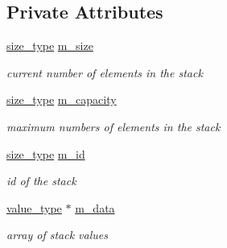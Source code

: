 \subsection*{Private Attributes}
\begin{DoxyCompactItemize}
\item 
\mbox{\label{class_my_stack_a6e16f21887aa6db7709cf79a8d55f92b}} 
\hyperlink{class_my_stack_a6e8ab1801eb1cf3b66928e0c0f2fe0fe}{size\+\_\+type} \hyperlink{class_my_stack_a6e16f21887aa6db7709cf79a8d55f92b}{m\+\_\+size}
\begin{DoxyCompactList}\small\item\em current number of elements in the stack \end{DoxyCompactList}\item 
\mbox{\label{class_my_stack_ad4cf1e854cd1577abdc8278bb09b71e4}} 
\hyperlink{class_my_stack_a6e8ab1801eb1cf3b66928e0c0f2fe0fe}{size\+\_\+type} \hyperlink{class_my_stack_ad4cf1e854cd1577abdc8278bb09b71e4}{m\+\_\+capacity}
\begin{DoxyCompactList}\small\item\em maximum numbers of elements in the stack \end{DoxyCompactList}\item 
\mbox{\label{class_my_stack_aca6011976023e1b4a4cfabecbce339e8}} 
\hyperlink{class_my_stack_a6e8ab1801eb1cf3b66928e0c0f2fe0fe}{size\+\_\+type} \hyperlink{class_my_stack_aca6011976023e1b4a4cfabecbce339e8}{m\+\_\+id}
\begin{DoxyCompactList}\small\item\em id of the stack \end{DoxyCompactList}\item 
\mbox{\label{class_my_stack_a8fcfea74da05d3cbc9ae88ef31970393}} 
\hyperlink{class_my_stack_aef491ce2544b335e96d24a39ad23bc7c}{value\+\_\+type} $\ast$ \hyperlink{class_my_stack_a8fcfea74da05d3cbc9ae88ef31970393}{m\+\_\+data}
\begin{DoxyCompactList}\small\item\em array of stack values \end{DoxyCompactList}\end{DoxyCompactItemize}
